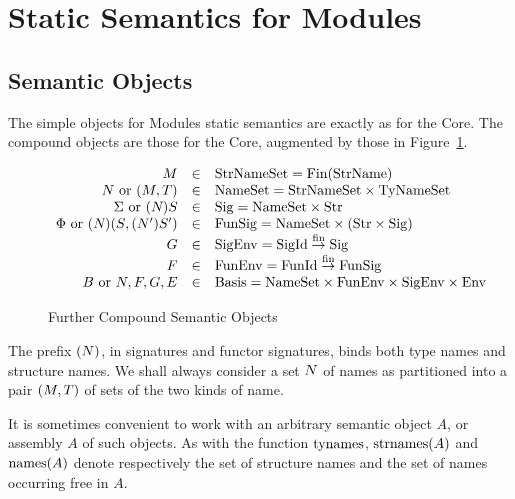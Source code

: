 \section{Static Semantics for Modules}
\label{statmod-sec}
\subsection{Semantic Objects}
\label{statmod-sem-obj-sec}
The simple 
objects for Modules static semantics are exactly as for the Core.
The compound objects are those for the Core,
augmented by those in Figure~\ref{module-objects}.


\begin{figure}[h]
\begin{displaymath}
\begin{array}{rcl}
M		& \in	& {\rm StrNameSet} = \mathop{\rm Fin}\nolimits({\rm StrName})\\
N\ {\rm or}\ (M,T)
                & \in	& {\rm NameSet} = {\rm StrNameSet}\times{\rm TyNameSet}\\
\Sigma\ {\rm or}\ (N_{})S_{}
        	& \in	& {\rm Sig} =  {\rm NameSet}\times{\rm Str} \\
\Phi\ {\rm or}\ (N_{})(S_{},(N_{}')S_{} ')
         	& \in	& {\rm FunSig} = {\rm NameSet}\times
                                         ({\rm Str}\times{\rm Sig})\\
G		& \in	& {\rm SigEnv}	 =	 {\rm SigId}\stackrel{{\rm fin}}{\to}{\rm Sig} \\
F		& \in	& {\rm FunEnv}	 =	 {\rm FunId}\stackrel{{\rm fin}}{\to}{\rm FunSig} \\
B\ {\rm or}\ N,F,G,E
        	& \in	& {\rm Basis} = {\rm NameSet}\times
                                              {\rm FunEnv}\times{\rm SigEnv}\times{\rm Env}\\
\end{array}
\end{displaymath}
\caption{Further Compound Semantic Objects}
\label{module-objects}
\end{figure}
%
The prefix $(N)$, in signatures and functor signatures, binds both type names
and structure names. We shall always consider a set $N$ of names as
partitioned into a pair $(M,T)$ of sets of the two kinds of name.

It is sometimes convenient to work with an arbitrary semantic object $A$, or
assembly $A$ of such objects.
As with the function $\mathop{\rm tynames}\nolimits$,
$\mathop{\rm strnames}\nolimits(A)$ and $\mathop{\rm names}\nolimits(A)$ denote respectively the set of structure names
and the set of names occurring free in $A$.

